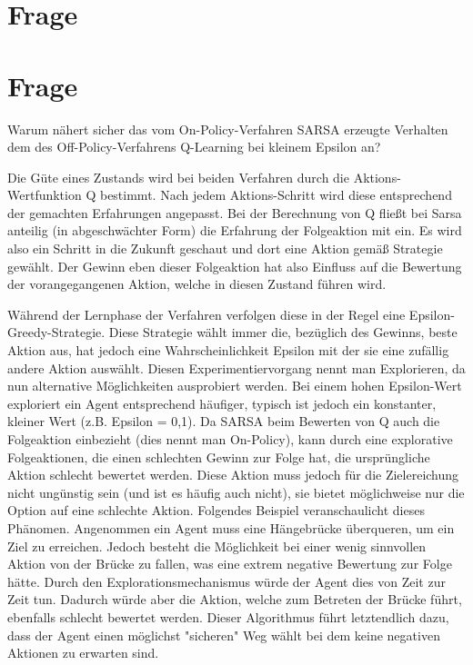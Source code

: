 \documentclass[10pt]{scrartcl}
\author{Steffen Brauer, André Harms,\\ Florian Johannßen, Jan-Christoph Meier,\\ Florian Ocker, Olaf Potratz,\\ Torben Woggan}
\title{\titletext}
\date{10.06.2012}
\begin{document}
\maketitle

\setcounter{tocdepth}{3}
\tableofcontents

	\listoffigures  
\newpage
\section{Frage}

\section{Frage}
Warum nähert sicher das vom On-Policy-Verfahren SARSA erzeugte Verhalten dem des Off-Policy-Verfahrens Q-Learning bei kleinem Epsilon an?

Die Güte eines Zustands wird bei beiden Verfahren durch die Aktions-Wertfunktion Q bestimmt. Nach jedem Aktions-Schritt wird diese entsprechend der gemachten Erfahrungen angepasst. Bei der Berechnung von Q fließt bei Sarsa anteilig (in abgeschwächter Form) die Erfahrung der Folgeaktion mit ein. Es wird also ein Schritt in die Zukunft geschaut und dort eine Aktion gemäß Strategie gewählt. Der Gewinn eben dieser Folgeaktion hat also Einfluss auf die Bewertung der vorangegangenen Aktion, welche in diesen Zustand führen wird. 

Während der Lernphase der Verfahren verfolgen diese in der Regel eine Epsilon-Greedy-Strategie. Diese Strategie wählt immer die, bezüglich des Gewinns, beste Aktion aus, hat jedoch eine Wahrscheinlichkeit Epsilon mit der sie eine zufällig andere Aktion auswählt. Diesen Experimentiervorgang nennt man Explorieren, da nun alternative Möglichkeiten ausprobiert werden. Bei einem hohen Epsilon-Wert exploriert ein Agent entsprechend häufiger, typisch ist jedoch ein konstanter, kleiner Wert (z.B. Epsilon = 0,1).
Da SARSA beim Bewerten von Q auch die Folgeaktion einbezieht (dies nennt man On-Policy), kann durch eine explorative Folgeaktionen, die einen schlechten Gewinn zur Folge hat, die ursprüngliche Aktion schlecht bewertet werden. Diese Aktion muss jedoch für die Zielereichung nicht ungünstig sein (und ist es häufig auch nicht), sie bietet möglichweise nur die Option auf eine schlechte Aktion. Folgendes Beispiel veranschaulicht dieses Phänomen. Angenommen ein Agent muss eine Hängebrücke überqueren, um ein Ziel zu erreichen. Jedoch besteht die Möglichkeit bei einer wenig sinnvollen Aktion von der Brücke zu fallen, was eine extrem negative Bewertung zur Folge hätte. Durch den Explorationsmechanismus würde der Agent dies von Zeit zur Zeit tun. Dadurch würde aber die Aktion, welche zum Betreten der Brücke führt, ebenfalls schlecht bewertet werden. Dieser Algorithmus führt letztendlich dazu, dass der Agent einen möglichst "sicheren" Weg wählt bei dem keine negativen Aktionen zu erwarten sind.
\end{document}
